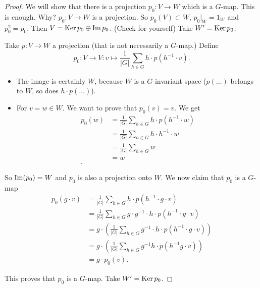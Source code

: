 \begin{proof}
    We will show that there is a projection $ p_0: V \to  W$ which is a $G$-map.
    This is enough. Why?
    $ p_0:V \to  W$ is a projection. So $ p_0(V) \subset W$, $ p_0|_W = 1_{W}$ and $ p_0^2 = p_0$.
    Then $V = \operatorname{Ker} p_0 \oplus \operatorname{Im} p_0$. (Check for yourself)
    Take $W' = \operatorname{Ker} p_0$.


    Take $p: V \to  W$ a projection (that is not necessarily a $G$-map.)
    Define
    \[
        p_0: V \to  V : v\mapsto \frac{1}{|G|} \sum_{h \in G} h\cdot p(h^{-1}\cdot v)
    .\] 
    \begin{itemize}
        \item The image is certainly $W$, because $W$ is a $G$-invariant space ($p(\ldots)$ belongs to $W$, so does $h\cdot p(\ldots)$).
        \item For $v = w \in W$. We want to prove that $ p_0(v) = v$. We get
            \begin{align*}
                p_0(w) &=\frac{1}{|G|} \sum _{h \in G} h \cdot p(h^{-1} \cdot w)\\
                &= 
                \frac{1}{|G|} \sum _{h \in G} h \cdot h^{-1} \cdot w \\
                                    &= \frac{1}{|G|} \sum _{h \in G} w \\
                                    &= w \\
            .\end{align*}
    \end{itemize}

    So $\operatorname{Im} (p_0) = W$ and $p_0$ is also a projection onto $W$.
    We now claim that $p_0$ is a $G$-map
    \begin{align*}
        p_0(g\cdot v)
        &= \frac{1}{|G|} \sum_{h \in G} h\cdot p(h^{-1}\cdot g \cdot v)\\
        &= \frac{1}{|G|} \sum_{h \in G} g\cdot  g^{-1}\cdot h\cdot p(h^{-1}\cdot g \cdot v)\\
        &= g\cdot \left(\frac{1}{|G|} \sum_{h \in G} g^{-1}\cdot h\cdot p(h^{-1}\cdot g \cdot v)\right)\\
        &= g\cdot \left(\frac{1}{|G|} \sum_{h \in G} g^{-1}h\cdot p(h^{-1}g \cdot v)\right)\\
        &= g\cdot p_0(v)
    .\end{align*}

    This proves that $p_0$ is a $G$-map.
    Take $W' = \operatorname{Ker} p_0$.
\end{proof}


